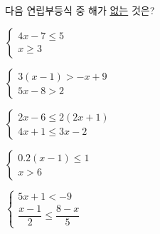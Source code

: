다음 연립부등식 중 해가 \underline{없는} 것은?
\begin{choicesii}{\rule[-3ex]{0pt}{8ex}$\begin{cases} 4x-7\le 5 \\ x\ge 3 \end{cases}$}{\rule[-3ex]{0pt}{8ex}$\begin{cases} 3(x-1)>-x+9 \\ 5x-8>2 \end{cases}$}{\rule[-3ex]{0pt}{8ex}$\begin{cases} 2x-6\le 2(2x+1) \\ 4x+1\le 3x-2 \end{cases}$}{\rule[-3ex]{0pt}{8ex}$\begin{cases} 0.2(x-1)\le 1 \\ x>6 \end{cases}$}{\rule[-3ex]{0pt}{8ex}$\begin{cases} 5x+1<-9 \\[2pt] \dfrac{x-1}{2}\le \dfrac{8-x}{5} \end{cases}$}\end{choicesii}

